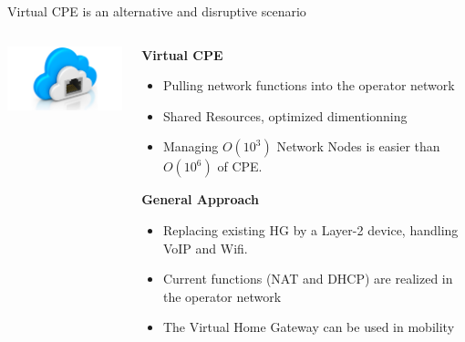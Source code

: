\documentclass[a4paper]{beamer}
\begin{document}
\begin{frame}{Virtual CPE is an alternative and disruptive scenario}
						
	\begin{columns}[T]
		\begin{column}[T]{0.33 \textwidth} 
			\vspace{2.2cm}
			\includegraphics[width=12em]{vhg.png}
		\end{column}
										
		\begin{column}[T]{0.66\textwidth} 
										   
			\textbf{ Virtual CPE}
			\begin{itemize}
				\item Pulling network functions into the operator network
				\item Shared Resources, optimized dimentionning
				\item Managing $O(10^{3})$ Network Nodes is easier than $O(10^{6})$ of CPE.
			\end{itemize}
			\vspace{3mm}
			\textbf{General Approach}
			\begin{itemize}
				\item Replacing existing HG by a Layer-2 device, handling VoIP and Wifi.
				\item Current functions (NAT and DHCP) are realized in the operator network
				\item The Virtual Home Gateway can be used in mobility 
			\end{itemize}
										
																																						
		\end{column}
																										
	\end{columns}
										
\end{frame}
\end{document}

